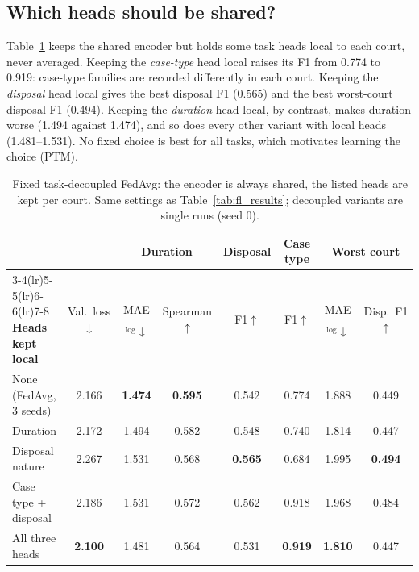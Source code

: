 \subsection{Which heads should be shared?}
Table~\ref{tab:decoupled} keeps the shared encoder but holds some task heads local to each court, never averaged. Keeping the \emph{case-type} head local raises its F1 from 0.774 to 0.919: case-type families are recorded differently in each court. Keeping the \emph{disposal} head local gives the best disposal F1 (0.565) and the best worst-court disposal F1 (0.494). Keeping the \emph{duration} head local, by contrast, makes duration worse (1.494 against 1.474), and so does every other variant with local heads (1.481--1.531). No fixed choice is best for all tasks, which motivates learning the choice (PTM).

\begin{table}[H]
\centering
\footnotesize
\setlength{\tabcolsep}{4pt}
\renewcommand{\arraystretch}{1.08}
\begin{tabular}{l c cc c c cc}
\toprule
& & \multicolumn{2}{c}{\textbf{Duration}} & \textbf{Disposal} & \textbf{Case type} & \multicolumn{2}{c}{\textbf{Worst court}} \\
\cmidrule(lr){3-4}\cmidrule(lr){5-5}\cmidrule(lr){6-6}\cmidrule(lr){7-8}
\textbf{Heads kept local} & Val.\ loss$\downarrow$ & MAE$_{\log}\downarrow$ & Spearman$\uparrow$ & F1$\uparrow$ & F1$\uparrow$ & MAE$_{\log}\downarrow$ & Disp.\ F1$\uparrow$ \\
\midrule
None (FedAvg, 3 seeds) & 2.166 & \textbf{1.474} & \textbf{0.595} & 0.542 & 0.774 & 1.888 & 0.449 \\
Duration & 2.172 & 1.494 & 0.582 & 0.548 & 0.740 & 1.814 & 0.447 \\
Disposal nature & 2.267 & 1.531 & 0.568 & \textbf{0.565} & 0.684 & 1.995 & \textbf{0.494} \\
Case type + disposal & 2.186 & 1.531 & 0.572 & 0.562 & 0.918 & 1.968 & 0.484 \\
All three heads & \textbf{2.100} & 1.481 & 0.564 & 0.531 & \textbf{0.919} & \textbf{1.810} & 0.447 \\
\bottomrule
\end{tabular}
\caption{Fixed task-decoupled FedAvg: the encoder is always shared, the listed heads are kept per court. Same settings as Table~\ref{tab:fl_results}; decoupled variants are single runs (seed 0).}
\label{tab:decoupled}
\end{table}

